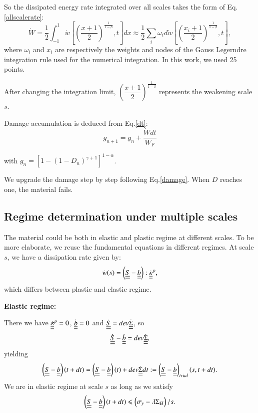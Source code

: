 \documentclass[3p,times,number,review]{elsarticle}
\begin{document}
So the dissipated energy rate integrated over all scales takes the form of Eq.\eqref{allscalerate}:
\begin{equation}
\dot{W}=\frac{1}{2}\int_{-1}^{1}\dot{w}\left[  \left( \frac{x+1}{2}\right) ^{\frac{1}{1-\beta}},t\right] dx\approx\frac{1}{2}\sum_{i}\omega_id\dot{w}\left[  \left( \frac{x_i+1}{2}\right) ^{\frac{1}{1-\beta}},t\right],
\label{allscalerate}
\end{equation}
where $\omega_i$ and $x_i$ are respectively the weights and nodes of the Gauss Legerndre integration rule used for the numerical integration. In this work, we used 25 points\cite{legendre}.

After changing the integration limit, $\left( \dfrac{x+1}{2}\right) ^{\frac{1}{1-\beta}}$ represents the weakening scale $s$. 

Damage accumulation is deduced from Eq.\eqref{dt}:
\begin{equation}
g_{n+1}=g_n+\dfrac{\dot{W}dt}{W_F}
\label{damage}
\end{equation}

with $g_n=\left[ 1-\left( 1-D_{n}\right)^{\gamma+1} \right]^{1-\alpha}$.

We upgrade the damage step by step following Eq.\eqref{damage}. When $D$ reaches one, the material fails. 

\subsection{Regime determination under multiple scales}
The material could be both in elastic and plastic regime at different scales. To be more elaborate, we reuse the fundamental equations in different regimes. At scale $s$, we have a dissipation rate given by:
$$\dot{w}(s)=\left( \uline{\uline{S}}-\uline{\uline{b}}\right):\dot{\uline{\uline{\varepsilon}}}^p, $$
which differs between plastic and elastic regime.

\vspace{6pt}
\noindent
\textbf{Elastic regime:}

\vspace{6pt}
\noindent
There we have
$\dot{\uline{\uline{\varepsilon}}}^p=0$, $\dot{\uline{\uline{b}}}=0$ and $\dot{\uline{\uline{S}}}=dev\dot{\uline{\uline{\Sigma}}}$, so
$$\dot{\uline{\uline{S}}}-\dot{\uline{\uline{b}}}=dev\dot{\uline{\uline{\Sigma}}},$$ 
yielding
\begin{equation}
\left( \uline{\uline{S}}-\uline{\uline{b}}\right) (t+dt)=\left( \uline{\uline{S}}-\uline{\uline{b}}\right) (t)+dev\dot{\uline{\uline{\Sigma}}}dt:=\left(  \uline{\uline{S}}-\uline{\uline{b}}\right)_{trial}(s,t+dt).
\label{trial}
\end{equation}
We are in elastic regime at scale $s$ as long as we satisfy
$$\left( \uline{\uline{S}}-\uline{\uline{b}}\right) (t+dt)\leqslant\left( \sigma_y-\lambda \Sigma_H\right)/s.$$
\end{document}
